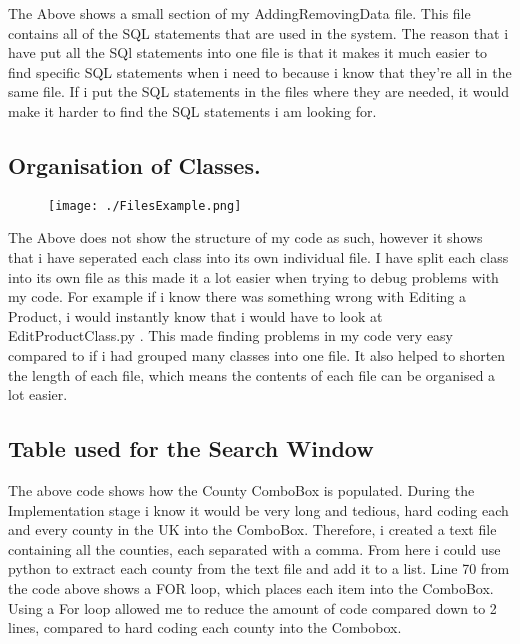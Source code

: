 The Above shows a small section of my AddingRemovingData file. This file contains all of the SQL statements that are used in the system. The reason that i have put all the SQl statements into one file is that it makes it much easier to find specific SQL statements when i need to because i know that they're all in the same file. If i put the SQL statements in the files where they are needed, it would make it harder to find the SQL statements i am looking for.

\subsection{Organisation of Classes.}
\begin{figure}[H]
    \texttt{[image: ./FilesExample.png]}
\end{figure}

The Above does not show the structure of my code as such, however it shows that i have seperated each class into its own individual file. I have split each class into its own file as this made it a lot easier when trying to debug problems with my code. For example if i know there was something wrong with Editing a Product, i would instantly know that i would have to look at EditProductClass.py . This made finding problems in my code very easy compared to if i had grouped many classes into one file. It also helped to shorten the length of each file, which means the contents of each file can be organised a lot easier.

\subsection{Table used for the Search Window}
\begin{figure}[H]
\end{figure}

The above code shows how the County ComboBox is populated. During the Implementation stage i know it would be very long and tedious, hard coding each and every county in the UK into the ComboBox. Therefore, i created a text file containing all the counties, each separated with a comma. From here i could use python to extract each county from the text file and add it to a list. Line 70 from the code above shows a FOR loop, which places each item into the ComboBox. Using a For loop allowed me to reduce the amount of code compared down to 2 lines, compared to hard coding each county into the Combobox. 


